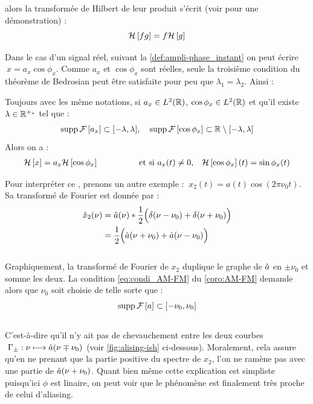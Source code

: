 \begin{annexe}
\begin{theoreme}[de Bedrosian]
\begin{itemize}
	\end{itemize}
	alors la transformée de Hilbert de leur produit s'écrit (voir \cite{wang_simple_2009} pour une démonstration) :
	\begin{equation}\label{eq:2Bedrosian}
		\mathcal{H}\left[fg\right] = f\mathcal{H}\left[g\right]
	\end{equation}
\end{theoreme}

Dans le cas d'un signal réel, suivant la \cref{def:ampli-phase_instant} on peut écrire $\ x=a_x\cos \phi_x$.
Comme $a_x$ et $\cos \phi_x$ sont réelles, seule la troisième condition du théorème de Bedrosian peut être satisfaite pour peu que $\lambda_1=\lambda_2$. Ainsi :

\begin{corollaire}\label{coro:AM-FM}
	Toujours avec les même notations, si $a_x\in L^2(\mathbb{R})$, $\cos\phi_x\in L^2(\mathbb{R})$ et qu'il existe $\lambda\in\mathbb{R}^{+_*}$ tel que :
	\begin{equation}\label{eq:condi_AM-FM}
		\text{\normalfont supp}\, \mathcal{F}\left[a_x\right] \subset [-\lambda, \lambda],\quad \text{\normalfont supp}\, \mathcal{F}\left[\cos\phi_x\right] \subset \mathbb{R}\setminus[-\lambda,\lambda]
	\end{equation}
	Alors on a :
	\begin{align}\label{eq:result_AM-FM}
		\mathcal{H}\left[x\right] &= a_x\mathcal{H}\left[\cos \phi_x\right]  &  \qquad\qquad&\text{et si }a_x(t)\neq 0,  &  \mathcal{H}\left[\cos \phi_x\right](t) = \sin\phi_x(t)
	\end{align}
\end{corollaire}
\skipl

Pour interpréter ce , prenons un autre exemple : $\ x_2(t) = a(t)\cos(2\pi \nu_0 t)$. Sa transformé de Fourier est donnée par :
\begin{align*}
	\hat{x}_2(\nu) &= \hat{a}(\nu)*\frac{1}{2}\Big(\delta(\nu-\nu_0) + \delta(\nu+\nu_0)\Big) \\
	&= \frac{1}{2}\Big(\hat{a}(\nu+\nu_0) + \hat{a}(\nu-\nu_0)\Big)
\end{align*}
\\
Graphiquement, la transformé de Fourier de $x_2$ duplique le graphe de $\hat{a}$ en $\pm\nu_0$ et somme les deux. La condition \eqref{eq:condi_AM-FM} du \cref{coro:AM-FM} demande alors que $\nu_0$ soit choisie de telle sorte que :
\[\text{\normalfont supp}\, \mathcal{F}\left[a\right]\subset[-\nu_0, \nu_0]\]
\\
C'est-à-dire qu'il n'y ait pas de chevauchement entre les deux courbes $\ \Gamma_\pm : \nu \longmapsto \hat{a}(\nu\mp\nu_0) $ (voir \cref{fig:alising-ish} ci-dessous). Moralement, cela assure qu'en ne prenant que la partie positive du spectre de $x_2$, l'on ne ramène pas avec une partie de $\hat{a}(\nu+\nu_0)$. Quant bien même cette explication est simpliste puisqu'ici $\phi$ est linaire, on peut voir que le phénomène est finalement très proche de celui d'aliasing.
\\


\end{annexe}
